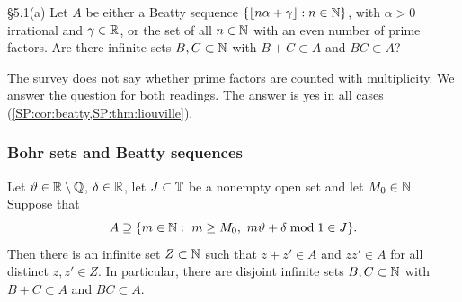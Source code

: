 \begin{question}{\S5.1(a)}\label{SP:q:u51a}
Let $A$ be either a Beatty sequence $\{\lfloor n\alpha+\gamma\rfloor:n\in\mathbb{N}\}$, with $\alpha>0$
irrational and $\gamma\in\mathbb{R}$, or the set of all $n\in\mathbb{N}$ with an even number of prime factors. Are there infinite sets
$B,C\subset\mathbb{N}$ with $B+C\subset A$ and $BC\subset A$?
\end{question}

The survey does not say whether prime factors are counted with multiplicity. We answer the
question for both readings. The answer is yes in all cases (\cref{SP:cor:beatty,SP:thm:liouville}).

\subsubsection{Bohr sets and Beatty sequences}

\begin{theorem}\label{SP:thm:bohr}
Let $\vartheta\in\mathbb{R}\setminus\mathbb{Q}$, $\delta\in\mathbb{R}$, let $J\subset\mathbb{T}$ be a nonempty open set and let
$M_0\in\mathbb{N}$. Suppose that
\[
A\supseteq\{m\in\N:\ m\ge M_0,\ m\vartheta+\delta\bmod 1\in J\}.
\]
Then there is an infinite set $Z\subset\mathbb{N}$ such that $z+z'\in A$ and $zz'\in A$ for all distinct
$z,z'\in Z$. In particular, there are disjoint infinite sets $B,C\subset\mathbb{N}$ with $B+C\subset A$
and $BC\subset A$.
\end{theorem}

